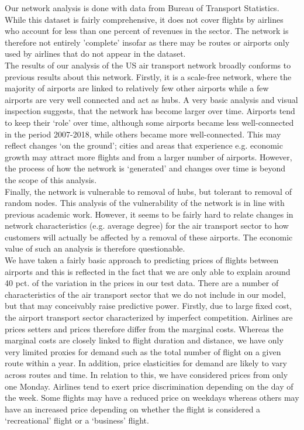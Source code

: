 \label{sec:results}
Our network analysis is done with data from Bureau of Transport Statistics. While this dataset is fairly comprehensive, it does not cover flights by airlines who account for less than one percent of revenues in the sector. The network is therefore not entirely 'complete' insofar as there may be routes or airports only used by airlines that do not appear in the dataset.\\
The results of our analysis of the US air transport network broadly conforms to previous results about this network. Firstly, it is a scale-free network, where the majority of airports are linked to relatively few other airports while a few airports are very well connected and act as hubs. A very basic analysis and visual inspection suggests, that the network has become larger over time. Airports tend to keep their `role' over time, although some airports became less well-connected in the period 2007-2018, while others became more well-connected. This may reflect changes `on the ground'; cities and areas that experience e.g. economic growth may attract more flights and from a larger number of airports. However, the process of how the network is `generated' and changes over time is beyond the scope of this analysis. \\ 
Finally, the network is vulnerable to removal of hubs, but tolerant to removal of random nodes. This analysis of the vulnerability of the network is in line with previous academic work. However, it seems to be fairly hard to relate changes in network characteristics (e.g. average degree) for the air transport sector to how customers will actually be affected by a removal of these airports. The economic value of such an analysis is therefore questionable. \\

We have taken a fairly basic approach to predicting prices of flights between airports and this is reflected in the fact that we are only able to explain around 40 pct. of the variation in the prices in our test data. There are a number of characteristics of the air transport sector that we do not include in our model, but that may conceivably raise predictive power. 
Firstly, due to large fixed cost, the airport transport sector characterized by imperfect competition. Airlines are prices setters and prices therefore differ from the marginal costs. Whereas the marginal costs are closely linked to flight duration and distance, we have only very limited proxies for demand such as the total number of flight on a given route within a year. In addition, price elasticities for demand are likely to vary across routes and time.
In relation to this, we have considered prices from only one Monday. Airlines tend to exert price discrimination depending on the day of the week. Some flights may have a reduced price on weekdays whereas others may have an increased price depending on whether the flight is considered a `recreational' flight or a `business' flight. 

